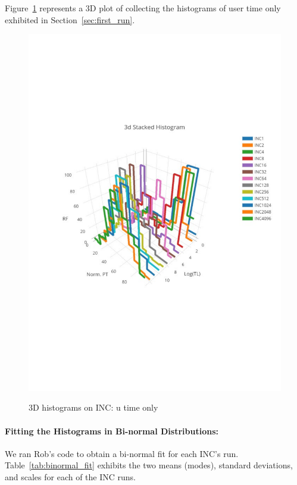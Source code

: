 \pagebreak
\clearpage
Figure~\ref{fig:hist3d_u} represents a 3D plot of collecting the histograms of user time only
exhibited in Section~\ref{sec:first_run}. 
\begin{figure}[htp!]
	\centering
	\includegraphics[scale=1]{u_s_time/3dplot_utime_only}\label{fig:3d_plot_u}
	\caption{3D histograms on INC: u time only~\label{fig:hist3d_u}}
\end{figure}

\clearpage
\pagebreak

\paragraph{Fitting the Histograms in Bi-normal Distributions:}
We ran Rob's code to obtain a bi-normal fit for each INC's run. 
Table~\ref{tab:binormal_fit} exhibits the two means (modes), standard deviations, and scales for each of the INC runs.

